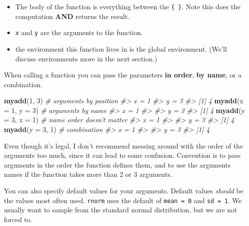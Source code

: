 \documentclass[]{book}
\newenvironment{Shaded}{\begin{snugshade}}{\end{snugshade}}
\newcommand{\KeywordTok}[1]{\textcolor[rgb]{0.13,0.29,0.53}{\textbf{#1}}}
\newcommand{\DataTypeTok}[1]{\textcolor[rgb]{0.13,0.29,0.53}{#1}}
\newcommand{\DecValTok}[1]{\textcolor[rgb]{0.00,0.00,0.81}{#1}}
\newcommand{\CommentTok}[1]{\textcolor[rgb]{0.56,0.35,0.01}{\textit{#1}}}
\newcommand{\NormalTok}[1]{#1}
\providecommand{\tightlist}{%
  \setlength{\itemsep}{0pt}\setlength{\parskip}{0pt}}
\let\BeginKnitrBlock\begin \let\EndKnitrBlock\end
\begin{document}
\begin{itemize}
\tightlist
\item
  The body of the function is everything between the \texttt{\{\ \}}.
  Note this does the computation \textbf{AND} returns the result.
\item
  \texttt{x} and \texttt{y} are the arguments to the function.
\item
  the environment this function lives in is the global environment.
  (We'll discuss environments more in the next section.)
\end{itemize}

When calling a function you can pass the parameters \textbf{in order},
\textbf{by name}, or a combination.

\begin{Shaded}
\begin{Highlighting}[]
\KeywordTok{myadd}\NormalTok{(}\DecValTok{1}\NormalTok{, }\DecValTok{3}\NormalTok{)            }\CommentTok{# arguments by position}
\CommentTok{#> x = 1}
\CommentTok{#> y = 3}
\CommentTok{#> [1] 4}
\KeywordTok{myadd}\NormalTok{(}\DataTypeTok{x =} \DecValTok{1}\NormalTok{, }\DataTypeTok{y =} \DecValTok{3}\NormalTok{)    }\CommentTok{# arguments by name}
\CommentTok{#> x = 1}
\CommentTok{#> }
\CommentTok{#> y = 3}
\CommentTok{#> [1] 4}
\KeywordTok{myadd}\NormalTok{(}\DataTypeTok{y =} \DecValTok{3}\NormalTok{, }\DataTypeTok{x =} \DecValTok{1}\NormalTok{)    }\CommentTok{# name order doesn't matter}
\CommentTok{#> x = 1}
\CommentTok{#> }
\CommentTok{#> y = 3}
\CommentTok{#> [1] 4}
\KeywordTok{myadd}\NormalTok{(}\DataTypeTok{y =} \DecValTok{3}\NormalTok{, }\DecValTok{1}\NormalTok{)        }\CommentTok{# combination}
\CommentTok{#> x = 1}
\CommentTok{#> }
\CommentTok{#> y = 3}
\CommentTok{#> [1] 4}
\end{Highlighting}
\end{Shaded}

\BeginKnitrBlock{rmdtip}
Even though it's legal, I don't recommend messing around with the order
of the arguments too much, since it can lead to some confusion.
Convention is to pass arguments in the order the function defines them,
and to use the arguments names if the function takes more than 2 or 3
arguments.
\EndKnitrBlock{rmdtip}

You can also specify default values for your arguments. Default values
\emph{should} be the values most often used. \texttt{rnorm} uses the
default of \texttt{mean\ =\ 0} and \texttt{sd\ =\ 1}. We usually want to
sample from the standard normal distribution, but we are not forced to.
\end{document}
